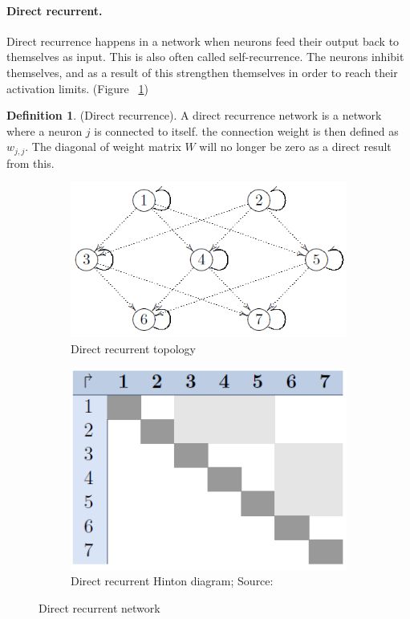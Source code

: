 \documentclass[pdftex,a4paper,12pt,twoside]{report}
\theoremstyle{plain} \newtheorem{theorem}{Theorem} \newtheorem{proposition}{Proposition} \newtheorem{lemma}{Lemma} \newtheorem*{corollary}{Corollary}
\theoremstyle{definition} \newtheorem{definition}{Definition} \newtheorem{conjecture}{Conjecture} \newtheorem*{example}{Example} \newtheorem{algorithm}{Algorithm}
\theoremstyle{remark} \newtheorem*{remark}{Remark} \newtheorem*{note}{Note} \newtheorem{case}{Case}
\begin{document}
\paragraph{Direct recurrent.}
Direct recurrence happens in a network when neurons feed their output back to themselves as input. This is also often called self-recurrence. The neurons inhibit themselves, and as a result of this strengthen themselves in order to reach their activation limits. (Figure ~\ref{fig:directrecurrent})
\begin{definition}
(Direct recurrence). A direct recurrence network is a network where a neuron $j$ is connected to itself. the connection weight is then defined as $w_{j,j}$. The diagonal of weight matrix $W$ will no longer be zero as a direct result from this.
\end{definition}
\begin{figure}
\centering
	\begin{subfigure}[b]{0.49\textwidth}
	\centering
	\includegraphics[width=\textwidth]{./img/recurrent-direct-Topology.png}
	\caption{Direct recurrent topology}
	\end{subfigure}
	\begin{subfigure}[b]{0.49\textwidth}
	\centering
	\includegraphics[width=\textwidth]{./img/recurrent-direct-Hinton.png}
	\caption{Direct recurrent Hinton diagram; Source:\citep{Kriesel2013}}
	\end{subfigure}
\caption{Direct recurrent network}
\label{fig:directrecurrent}
\end{figure}
\end{document}
